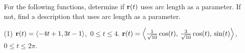 \documentclass[../mathNotesPreamble]{subfiles}
\begin{document}
  \begin{ex*}
    For the following functions, determine if ${\mathbf{r}}(t)$ uses arc length as a parameter. If not, find a description that uses arc length as a parameter.
  \end{ex*}
  \begin{tasks}[after-item-skip=\stretch{1}](1)
    \task ${\mathbf{r}}(t)={\left\langle -4t+1,3t-1 \right\rangle}$,\ $0\leq t\leq 4$.
    \task ${\mathbf{r}}(t)={\left\langle \frac{1}{\sqrt{10}}\cos(t),\,\frac{3}{\sqrt{10}}\cos(t),\,\sin(t) \right\rangle}$,\ $0\leq t\leq 2\pi$.
  \end{tasks}
  \pagebreak
\end{document}
